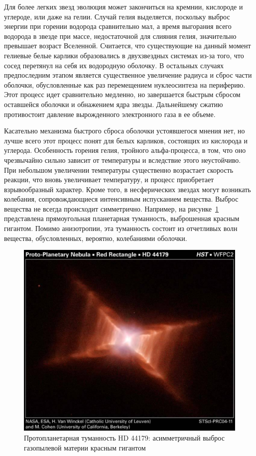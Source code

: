 \documentclass[a4paper, 14pt]{extarticle}
\begin{document}
Для более легких звезд эволюция может закончиться на кремнии, кислороде 
и углероде, или даже на гелии. Случай гелия выделяется, поскольку выброс 
энергии при горении водорода сравнительно мал, а время выгорания всего 
водорода в звезде при массе, недостаточной для слияния гелия, 
значительно превышает возраст Вселенной. Считается, что существующие на 
данный момент гелиевые белые карлики образовались в двухзвездных 
системах из-за того, что сосед перетянул на себя их водородную оболочку. 
В остальных случаях предпоследним этапом является существенное 
увеличение радиуса и сброс части оболочки, обусловленные как раз 
перемещением нуклеосинтеза на периферию. Этот процесс идет сравнительно 
медленно, но завершается быстрым сбросом оставшейся оболочки 
и обнажением ядра звезды. Дальнейшему сжатию противостоит давление 
вырожденного электронного газа в ее объеме.

Касательно механизма быстрого сброса оболочки устоявшегося мнения нет, 
но лучше всего этот процесс понят для белых карликов, состоящих из 
кислорода и углерода. Особенность горения гелия, тройного альфа-процесса, 
в том, что оно чрезвычайно сильно зависит от температуры и вследствие 
этого неустойчиво. При небольшом увеличении температуры существенно 
возрастает скорость реакции, что вновь увеличивает температуру, 
и процесс приобретает взрывообразный характер. Кроме того, 
в несферических звездах могут возникать колебания, сопровождающиеся 
интенсивным испусканием вещества. Выброс вещества не всегда происходит 
симметрично. Например, на рисунке~\ref{fig:red.rect} представлена 
прямоугольная планетарная туманность, выброшенная красным гигантом. 
Помимо анизотропии, эта туманность состоит из отчетливых волн вещества, 
обусловленных, вероятно, колебаниями оболочки.

\begin{figure}%
	\centering
	\includegraphics[width=.5\textwidth]{figures/Proto-Planetary.Nebula.HD44179.large.jpg.pdf}
	\caption{Протопланетарная туманность HD 44179: асимметричный выброс газопылевой материи красным гигантом}
	\label{fig:red.rect}
\end{figure}%
\end{document}
